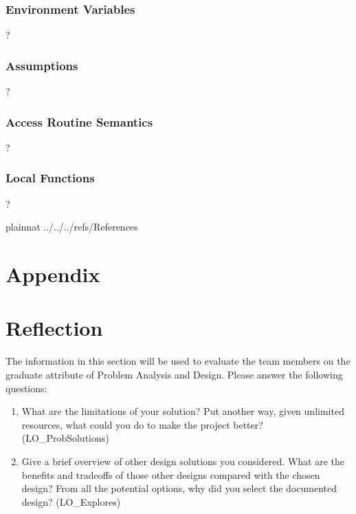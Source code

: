 \documentclass[12pt, titlepage]{article}
\begin{document}
\subsubsection{Environment Variables}
?

\subsubsection{Assumptions}
?

\subsubsection{Access Routine Semantics}
?

\subsubsection{Local Functions}
?


\newpage

 {plainnat}
 {../../../refs/References}

\newpage

\section{Appendix} \label{Appendix}


\section{Reflection}

The information in this section will be used to evaluate the team members on the
graduate attribute of Problem Analysis and Design.  Please answer the following questions:

\begin{enumerate}
  \item What are the limitations of your solution?  Put another way, given
  unlimited resources, what could you do to make the project better? (LO\_ProbSolutions)
  \item Give a brief overview of other design solutions you considered.  What
  are the benefits and tradeoffs of those other designs compared with the chosen
  design?  From all the potential options, why did you select the documented design?
  (LO\_Explores)
\end{enumerate}
\end{document}
